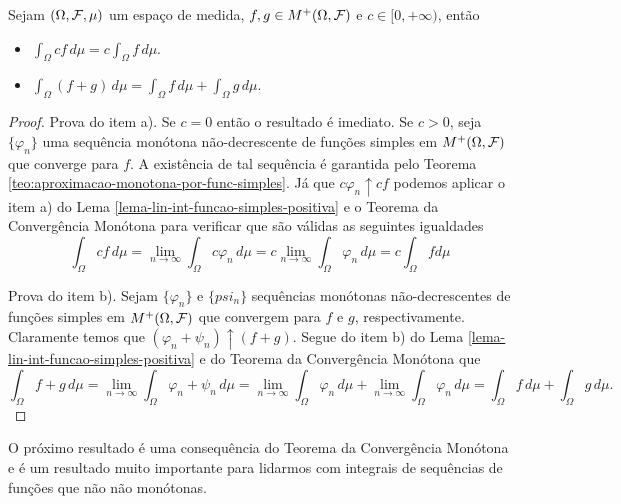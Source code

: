\begin{corolario}
\label{cor-linearidade-int-funcao-mens-positiva}
Sejam $(\Omega,\mathcal{F},\mu)$ um espaço de medida, 
$f,g \in M^+(\Omega,\mathcal{F})$ e $c\in [0,+\infty)$,
então
\begin{itemize}
	\item[a)]
	\(\displaystyle 
		\int_{\Omega} c f\, d\mu
		=
		c\int_{\Omega} f \, d\mu.
	\)
	

	\item[b)]
	\(\displaystyle 
		\int_{\Omega} (f+g)\, d\mu
		=
		\int_{\Omega} f \, d\mu
		+
		\int_{\Omega} g \, d\mu.
	\)

\end{itemize}
\end{corolario}


\begin{proof}
Prova do item a). 
Se $c=0$ então o resultado é imediato.
Se $c>0$, seja $\{\varphi_n\}$ uma sequência 
monótona não-decrescente de funções simples em 
$M^{+}(\Omega,\mathcal{F})$ que converge para $f$.
A existência de tal sequência é garantida 
pelo Teorema \ref{teo:aproximacao-monotona-por-func-simples}.
Já que $c\varphi_n \uparrow cf$ podemos aplicar o item a) do
Lema \ref{lema-lin-int-funcao-simples-positiva} e
o Teorema da Convergência Monótona para verificar que 
são válidas as seguintes igualdades
	\[
	\int_{\Omega} cf\, d\mu
	=
	\lim_{n\to\infty} \int_{\Omega} c\varphi_n\, d\mu
	=
	c\lim_{n\to\infty} \int_{\Omega} \varphi_n\, d\mu	
	=
	c\int_{\Omega} f d\mu		
	\] 



Prova do item b). Sejam 
$\{\varphi_n\}$ e $\{psi_n\}$ sequências
monótonas não-decrescentes de funções simples em 
$M^{+}(\Omega,\mathcal{F})$ que convergem para $f$ e $g$,
respectivamente. Claramente temos que 
$(\varphi_n+\psi_n) \uparrow (f+g)$.
Segue do item b) do 
Lema \ref{lema-lin-int-funcao-simples-positiva}
e do Teorema da Convergência Monótona que 
	\[
	\int_{\Omega} f+g\, d\mu
	=
	\lim_{n\to\infty} \int_{\Omega} \varphi_n+\psi_n\, d\mu
	=
	\lim_{n\to\infty} \int_{\Omega} \varphi_n\, d\mu
	+		
	\lim_{n\to\infty} \int_{\Omega} \varphi_n\, d\mu	
	=
	\int_{\Omega} f\, d\mu+\int_{\Omega} g\, d\mu.
	\] 
\end{proof}




O próximo resultado é uma consequência do Teorema 
da Convergência Monótona e é um resultado muito 
importante para lidarmos com integrais de sequências
de funções que não não monótonas.







